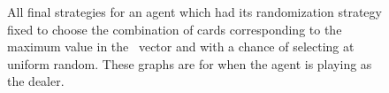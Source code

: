 \begin{figure}
\caption{
	All final strategies for an agent which had its randomization strategy fixed
	to choose the combination of cards corresponding to the maximum value in
	the \pvec\ vector and with a chance of selecting at uniform random.
	These graphs are for when the agent is playing as the dealer.
}
\label{fig:expts-rand-strats}
\end{figure}
